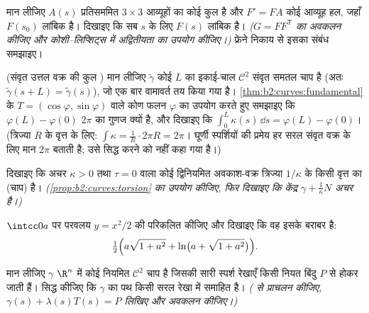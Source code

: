 \begin{exercise}[$\star\star\star$]\label{exo:b2:curves:7}
मान लीजिए $A(s)$ प्रतिसममित $3 \times 3$ आव्यूहों का कोई  कुल है
और $F' = F A$ कोई आव्यूह हल, जहाँ $F(s_0)$ लांबिक है। दिखाइए
कि सब $s$ के लिए $F(s)$ लांबिक है।
\emph{($G = F F^{\mathsf T}$ का अवकलन कीजिए और कोशी--लिप्शिट्स में अद्वितीयता का
उपयोग कीजिए।)} फ्रेने निकाय से इसका संबंध समझाइए।
\end{exercise}

\begin{exercise}[$\star\star\star$]\label{exo:b2:curves:8}
(संवृत उत्तल वक्र की कुल ) मान लीजिए $\tilde\gamma$ कोई 
$L$ का इकाई-चाल $\mathcal{C}^2$ संवृत समतल चाप है
(अतः $\tilde\gamma(s + L) = \tilde\gamma(s)$), जो एक बार वामावर्त तय
किया गया है। \cref{thm:b2:curves:fundamental} के $T =
(\cos\varphi, \sin\varphi)$ वाले कोण फलन $\varphi$ का उपयोग करते
हुए समझाइए कि $\varphi(L) -
\varphi(0)$ $2\pi$ का गुणज क्यों है, और दिखाइए कि
$\int_0^L \kappa(s)\,\dd s = \varphi(L) - \varphi(0)$। (त्रिज्या $R$ के वृत्त के लिए: $\int \kappa = \frac1R \cdot 2\pi R = 2\pi$।
घूर्णी स्पर्शियों की प्रमेय हर सरल संवृत वक्र के लिए मान $2\pi$
बताती है; उसे सिद्ध करने को नहीं कहा गया है।)
\end{exercise}

\begin{exercise}[$\star\star\star$]\label{exo:b2:curves:9}
दिखाइए कि अचर $\kappa > 0$ तथा $\tau = 0$ वाला कोई द्विनियमित अवकाश-वक्र
त्रिज्या $1/\kappa$ के किसी वृत्त का (चाप) है।
\emph{(\cref{prop:b2:curves:torsion} का उपयोग कीजिए, फिर दिखाइए कि केंद्र
$\gamma + \frac1\kappa N$ अचर है।)}
\end{exercise}

\begin{exercise}[$\star$]\label{exo:b2:curves:10}
$\intcc0a$ पर परवलय $y = x^2/2$ की  परिकलित कीजिए और दिखाइए
कि वह इसके बराबर है:
\[
\tfrac12\Bigl(a\sqrt{1 + a^2} + \ln\bigl(a + \sqrt{1 +
a^2}\bigr)\Bigr).
\]
\end{exercise}

\begin{exercise}[$\star\star$]\label{exo:b2:curves:11}
मान लीजिए $\gamma$ $\R^n$ में कोई नियमित $\mathcal C^2$ चाप है जिसकी सारी
स्पर्श रेखाएँ किसी नियत बिंदु $P$ से होकर जाती हैं। सिद्ध कीजिए कि
$\gamma$ का पथ किसी सरल रेखा में समाहित है।
\emph{( से प्राचलन कीजिए, $\gamma(s) +
\lambda(s)T(s) = P$ लिखिए और अवकलन कीजिए।)}
\end{exercise}

